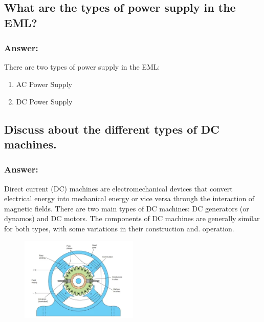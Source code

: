 \documentclass[12pt]{article}
\begin{document}
\subsection*{}
\subsection{What are the types of power supply in the EML?}
\subsubsection*{Answer:}
There are two types of power supply in the EML:
\begin{enumerate}
    \item AC Power Supply
    \item DC Power Supply
\end{enumerate}

\subsection{Discuss about the different types of DC machines.}
\subsubsection*{Answer:}
Direct current (DC) machines are electromechanical devices that convert electrical energy into mechanical energy or vice versa through the interaction of magnetic fields. There are two main types of DC machines: DC generators (or dynamos) and DC motors. The components of DC machines are generally similar for both types, with some variations in their construction and. operation.

\begin{figure}[htpb]
    \centering
    \includegraphics[width=0.5\textwidth]{./3.png}
\end{figure}
\end{document}
